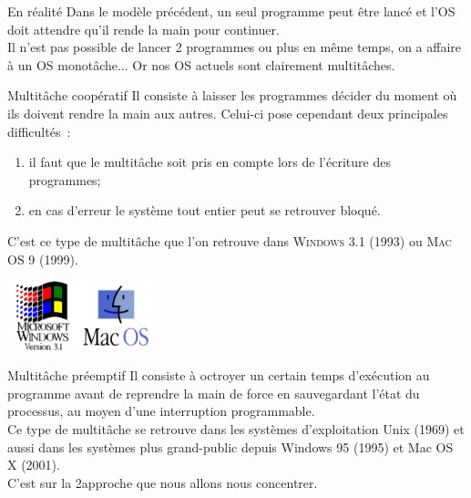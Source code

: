\documentclass[10pt]{beamer}
\begin{document}
\begin{frame}{En réalité}
Dans le modèle précédent, un seul programme peut être lancé et l'OS doit attendre qu'il \og rende la main\fg{} pour continuer.\\

Il n'est pas possible de lancer 2 programmes ou plus en même temps, on a affaire à un OS \alert{monotâche}... Or nos OS actuels sont clairement multitâches.
\end{frame}
\begin{frame}{Multitâche coopératif}
Il consiste à laisser les programmes décider du moment où ils doivent rendre la main aux autres. Celui-ci pose cependant deux principales difficultés :
\begin{enumerate}[--]
	\item il faut que le multitâche soit pris en compte lors de l'écriture des programmes;
    \item en cas d'erreur le système tout entier peut se retrouver bloqué.
\end{enumerate}
C'est ce type de multitâche que l'on retrouve dans \textsc{Windows 3.1} (1993) ou \textsc{Mac OS 9} (1999).\\
\begin{center}
\includegraphics[height=2cm]{img/win31}\hspace{2cm}\includegraphics[height=2cm]{img/macos}
\end{center}
\end{frame}
\begin{frame}{Multitâche préemptif}
Il consiste à octroyer un certain temps d'exécution au programme avant de reprendre la main de force en sauvegardant l'état du processus, au moyen d'une interruption programmable.\\
Ce type de multitâche se retrouve dans les systèmes d'exploitation Unix (1969) et aussi dans les systèmes plus grand-public depuis Windows 95 (1995) et Mac OS X (2001).\\

C'est sur la 2\eme approche que nous allons nous concentrer.
\end{frame}
\end{document}
